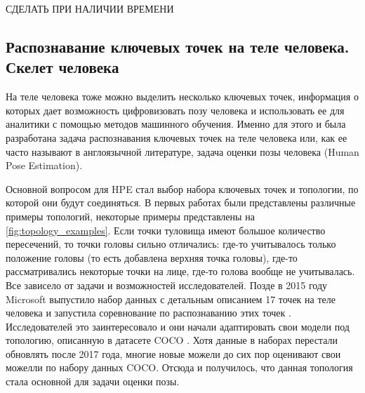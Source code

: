СДЕЛАТЬ ПРИ НАЛИЧИИ ВРЕМЕНИ

\subsection{Распознавание ключевых точек на теле человека. Скелет человека}

На теле человека тоже можно выделить несколько ключевых точек, информация о которых дает возможность цифровизовать позу человека и использовать ее для аналитики с помощью методов машинного обучения. Именно для этого и была разработана задача распознавания ключевых точек на теле человека  или, как ее часто называют в англоязычной литературе, задача оценки позы человека (Human Pose Estimation).

Основной вопросом для HPE стал выбор набора ключевых точек и топологии, по которой они будут соединяться. В первых работах были представлены различные примеры топологий, некоторые примеры представлены на \autoref{fig:topology_examples}. Если точки туловища имеют большое количество пересечений, то точки головы сильно отличались: где-то учитывалось только положение головы (то есть добавлена верхняя точка головы), где-то рассматривались некоторые точки на лице, где-то голова вообще не учитывалась. Все зависело от задачи и возможностей исследователей. Позде в 2015 году Microsoft выпустило набор данных с детальным описанием 17 точек на теле человека и запустила соревнование по распознаванию этих точек \cite{COCO_dataset, COCO_topology}. Исследователей это заинтересовало и они начали адаптировать свои модели под топологию, описанную в датасете COCO \cite{COCO_dataset}. Хотя данные в наборах перестали обновлять после 2017 года, многие новые можели до сих пор оценивают свои можелли по набору данных COCO. Отсюда и получилось, что данная топология стала основной для задачи оценки позы.

